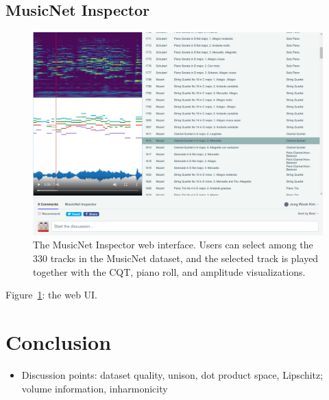 \subsection{MusicNet Inspector}

\begin{figure}
\includegraphics[width=\textwidth]{inspector.png}
\caption{The MusicNet Inspector web interface. Users can select among the 330 tracks in the MusicNet dataset, and the selected track is played together with the CQT, piano roll, and amplitude visualizations.}\label{fig:musicnet-inspector}
\end{figure}

Figure~\ref{fig:musicnet-inspector}: the web UI.

\section{Conclusion}

\begin{itemize}
	\item Discussion points: dataset quality, unison, dot product space, Lipschitz; volume information, inharmonicity
\end{itemize}

